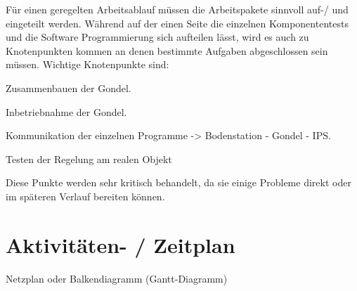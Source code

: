 \documentclass[lang=ngerman,inputenc=utf8,fontsize=10pt]{ldvarticle}
\begin{document}
Für einen geregelten Arbeitsablauf müssen die Arbeitspakete sinnvoll auf-/ und eingeteilt werden.
Während auf der einen Seite die einzelnen Komponententests und die Software Programmierung sich aufteilen lässt, wird es auch zu Knotenpunkten kommen an denen bestimmte Aufgaben abgeschlossen sein müssen. Wichtige Knotenpunkte sind:
\begin{list}{-}{}

\item Zusammenbauen der Gondel.
\item Inbetriebnahme der Gondel.
\item Kommunikation der einzelnen Programme -> Bodenstation - Gondel - IPS.
\item Testen der Regelung am realen Objekt
\end{list}

Diese Punkte werden sehr kritisch behandelt, da sie einige Probleme direkt oder im späteren Verlauf bereiten können.

\section{Aktivitäten- / Zeitplan}

Netzplan oder Balkendiagramm (Gantt-Diagramm)
\end{document}
